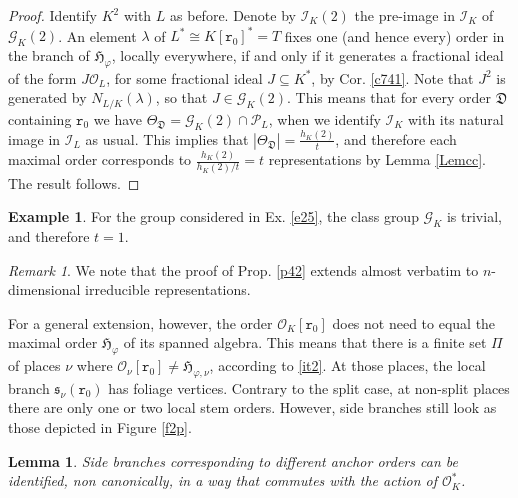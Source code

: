\documentclass{article}
\newtheorem{Lem}[Prop]{Lemma}
\theoremstyle{definition}
\newtheorem{ex}[Prop]{Example}
\theoremstyle{remark}
\newtheorem{rem}[Prop]{Remark}
\begin{document}
\begin{proof}
    Identify $K^2$ with $L$ as before. 
    Denote by $\mathcal{I}_K(2)$
    the pre-image in $\mathcal{I}_K$ of $\mathcal{G}_K(2)$.
      An element $\lambda$ of 
      $L^*\cong K[\mathtt{r}_0]^*=T$ fixes one (and 
      hence every) order in the branch of 
      $\mathfrak{H}_\varphi$, locally
      everywhere, if and only if it generates a 
      fractional ideal of the  form 
      $J\mathcal{O}_L$, for some fractional ideal 
      $J\subseteq K^*$, by Cor.
      \ref{c741}. 
      Note that $J^2$ is generated by 
      $N_{L/K}(\lambda)$, so that
      $J\in\mathcal{G}_K(2)$. 
      This means that for every order $\mathfrak{D}$ containing
      $\mathtt{r}_0$ we have 
      $\Theta_{\mathfrak{D}}=
      \mathcal{G}_K(2)\cap\mathcal{P}_L$, when we 
      identify $\mathcal{I}_K$ with its natural 
      image in $\mathcal{I}_L$ as
      usual. This implies that $|\Theta_{\mathfrak{D}}|=
      \frac{h_K(2)}t$, and therefore each maximal 
      order corresponds
      to  $\frac{h_K(2)}{h_K(2)/t}=t$ representations by Lemma
      \ref{Lemcc}. The result follows.
\end{proof}

\begin{ex} 
    For the group considered in Ex. \ref{e25},
    the class group $\mathcal{G}_K$ is trivial, 
    and therefore $t=1$.
\end{ex}



\begin{rem}
    We note that the proof of Prop. \ref{p42} 
    extends almost verbatim
    to $n$-dimensional irreducible representations.
\end{rem}


For a general extension, however, the 
order $\mathcal{O}_K[\mathtt{r}_0]$
does not need to equal the maximal order $\mathfrak{H}_\varphi$
of its spanned algebra.  This means that there is a 
finite set $\Pi$
of places $\nu$ where $\mathcal{O}_\nu[\mathtt{r}_0]\neq
\mathfrak{H}_{\varphi,\nu}$, according to \ref{it2}. 
At those places, the local branch
$\mathfrak{s}_{\nu}(\mathtt{r}_0)$ has foliage vertices. 
 Contrary to the split case, 
 at non-split places there 
are only one or two local stem orders. However, 
side branches still look as those depicted
in Figure \ref{f2p}.



\begin{Lem}
    Side branches corresponding to different anchor 
    orders can be 
    identified, non canonically, in a way that 
    commutes with the
    action of $\mathcal{O}_K^*$.
\end{Lem}
\end{document}
